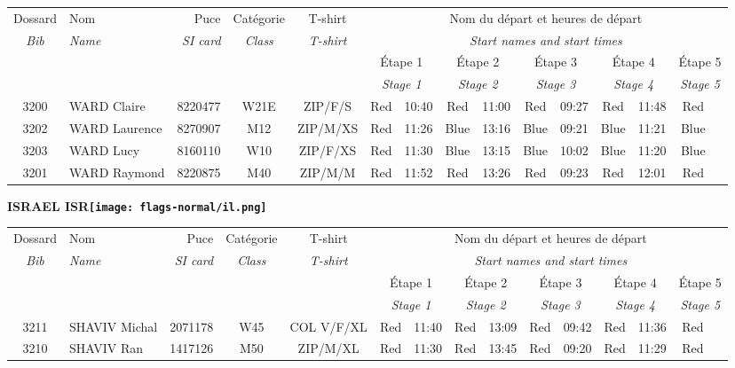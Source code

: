 \documentclass{report}
\begin{document}
  \begin{longtable}{|c|l|r|c|c|*{5}{cc|}}
    Dossard & Nom  & Puce    & Catégorie & T-shirt & \multicolumn{10}{c|}{Nom du départ et heures de départ} \\
    \itshape Bib     & \itshape Name & \itshape SI card & \itshape Class  & \itshape  T-shirt  & \multicolumn{10}{c|}{\itshape Start names and start times} \\
    \hline
    & & & & & \multicolumn{2}{c|}{Étape 1} & \multicolumn{2}{c|}{Étape 2} & \multicolumn{2}{c|}{Étape 3} & \multicolumn{2}{c|}{Étape 4} & \multicolumn{2}{c|}{Étape 5} \\
    & & & & & \multicolumn{2}{c|}{\itshape Stage 1} & \multicolumn{2}{c|}{\itshape Stage 2} & \multicolumn{2}{c|}{\itshape Stage 3} & \multicolumn{2}{c|}{\itshape Stage 4} & \multicolumn{2}{c|}{\itshape Stage 5} \\
    \hline
    3200 & WARD Claire & 8220477 & W21E & ZIP/F/S & Red & 10:40 & Red & 11:00 & Red & 09:27 & Red & 11:48 & Red &  \\
    3202 & WARD Laurence & 8270907 & M12 & ZIP/M/XS & Red & 11:26 & Blue & 13:16 & Blue & 09:21 & Blue & 11:21 & Blue &  \\
    3203 & WARD Lucy & 8160110 & W10 & ZIP/F/XS & Red & 11:30 & Blue & 13:15 & Blue & 10:02 & Blue & 11:20 & Blue &  \\
    3201 & WARD Raymond & 8220875 & M40 & ZIP/M/M & Red & 11:52 & Red & 13:26 & Red & 09:23 & Red & 12:01 & Red &  \\
  \end{longtable}
\newpage
  \Huge \centering \bfseries ISRAEL  ISR\normalfont \footnotesize \sffamily \hfill \texttt{[image: flags-normal/il.png]} \newline 
  \begin{longtable}{|c|l|r|c|c|*{5}{cc|}}
    Dossard & Nom  & Puce    & Catégorie & T-shirt & \multicolumn{10}{c|}{Nom du départ et heures de départ} \\
    \itshape Bib     & \itshape Name & \itshape SI card & \itshape Class  & \itshape  T-shirt  & \multicolumn{10}{c|}{\itshape Start names and start times} \\
    \hline
    & & & & & \multicolumn{2}{c|}{Étape 1} & \multicolumn{2}{c|}{Étape 2} & \multicolumn{2}{c|}{Étape 3} & \multicolumn{2}{c|}{Étape 4} & \multicolumn{2}{c|}{Étape 5} \\
    & & & & & \multicolumn{2}{c|}{\itshape Stage 1} & \multicolumn{2}{c|}{\itshape Stage 2} & \multicolumn{2}{c|}{\itshape Stage 3} & \multicolumn{2}{c|}{\itshape Stage 4} & \multicolumn{2}{c|}{\itshape Stage 5} \\
    \hline
    3211 & SHAVIV Michal & 2071178 & W45 & COL V/F/XL & Red & 11:40 & Red & 13:09 & Red & 09:42 & Red & 11:36 & Red &  \\
    3210 & SHAVIV Ran & 1417126 & M50 & ZIP/M/XL & Red & 11:30 & Red & 13:45 & Red & 09:20 & Red & 11:29 & Red &  \\
  \end{longtable}
\end{document}
